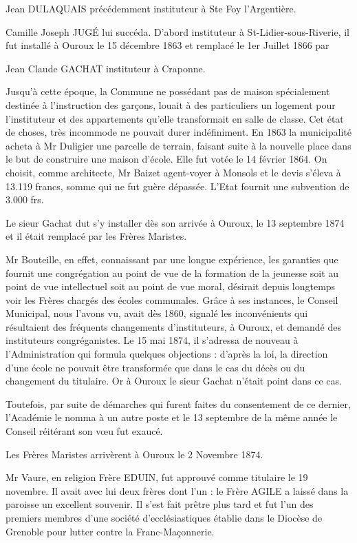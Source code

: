 Jean DULAQUAIS précédemment instituteur à Ste Foy l'Argentière.

Camille Joseph JUGÉ lui succéda. D'abord instituteur à St-Lidier-sous-Riverie, il fut installé à Ouroux le 15 décembre 1863 et remplacé le 1er Juillet 1866 par

Jean Claude GACHAT instituteur à Craponne.

Jusqu'à cette époque, la Commune ne possédant pas de maison spécialement destinée à l'instruction des garçons, louait à des particuliers un logement pour l'instituteur et des appartements qu'elle transformait en salle de classe. Cet état de choses, très incommode ne pouvait durer indéfiniment. En 1863 la municipalité acheta à Mr Duligier une parcelle de terrain, faisant suite à la nouvelle place
dans le but de construire une maison d'école. Elle fut votée le 14 février 1864. On choisit, comme architecte, Mr Baizet agent-voyer à Monsols et le devis s'éleva à 13.119 francs, somme qui ne fut guère dépassée. L'Etat fournit une subvention de 3.000 frs.

Le sieur Gachat dut s'y installer dès son arrivée à Ouroux, le 13 septembre 1874 et il était remplacé par les Frères Maristes.

Mr Bouteille, en effet, connaissant par une longue expérience, les garanties que fournit une congrégation au point de vue de la formation de la jeunesse soit au point de vue intellectuel soit au point de vue moral, désirait depuis longtemps voir les Frères chargés des écoles communales. Grâce à ses instances, le Conseil Municipal, nous l'avons vu, avait dès 1860, signalé les inconvénients qui résultaient des fréquents changements d'instituteurs, à Ouroux, et demandé des instituteurs congréganistes. Le 15 mai 1874, il s'adressa de nouveau à l'Administration qui formula quelques objections : d'après la loi, la direction d'une école ne pouvait être transformée que dans le cas du décès ou du changement du titulaire. Or à Ouroux le sieur Gachat n'était point dans ce cas.

Toutefois, par suite de démarches qui furent faites du consentement de ce dernier, l'Académie le nomma à un autre poste et le 13 septembre de la même année le Conseil réitérant son vœu fut exaucé.

Les Frères Maristes arrivèrent à Ouroux le 2 Novembre 1874.

Mr Vaure, en religion Frère EDUIN, fut approuvé comme titulaire le 19 novembre. Il avait avec lui deux frères dont l'un : le Frère AGILE a laissé dans la paroisse un excellent souvenir. Il s'est fait prêtre plus tard et fut l'un des premiers membres d'une société d'ecclésiastiques établie dans le Diocèse de Grenoble pour lutter contre la Franc-Maçonnerie.


